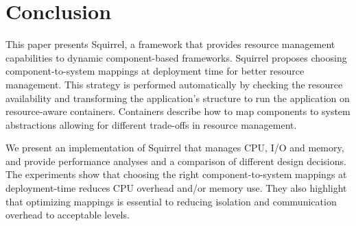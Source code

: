 
\section{Conclusion} \label{sec:conclusions}


This paper presents Squirrel, a framework that provides resource management capabilities to dynamic component-based frameworks.
Squirrel proposes choosing component-to-system mappings at deployment time for better resource management.
This strategy is performed automatically by checking the resource availability and transforming the application's structure to run the application on resource-aware containers.
Containers describe how to map components to system abstractions
allowing for different trade-offs in resource management.

We present an implementation of Squirrel that manages CPU, I/O and memory, and provide performance analyses and a comparison of different design decisions.
The experiments
show that choosing the right component-to-system mappings at deployment-time reduces CPU overhead and/or memory use.
They also highlight that optimizing mappings is essential to reducing isolation and communication overhead to acceptable levels.

